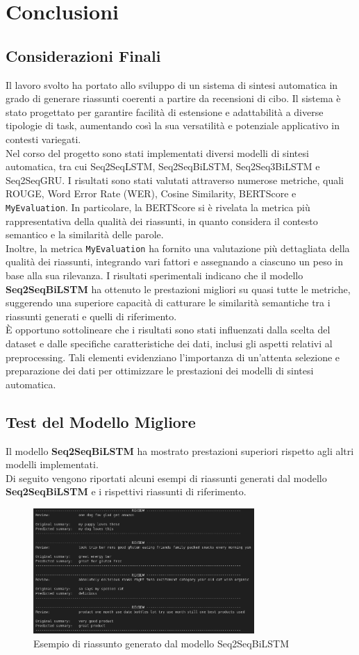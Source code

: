\section{Conclusioni} 
\subsection{Considerazioni Finali}
Il lavoro svolto ha portato allo sviluppo di un sistema di sintesi automatica in grado di generare riassunti coerenti a partire da recensioni di cibo. Il sistema è stato progettato per garantire facilità di estensione e adattabilità a diverse tipologie di task, aumentando così la sua versatilità e potenziale applicativo in contesti variegati.\\
Nel corso del progetto sono stati implementati diversi modelli di sintesi automatica, tra cui Seq2SeqLSTM, Seq2SeqBiLSTM, Seq2Seq3BiLSTM e Seq2SeqGRU.
I risultati sono stati valutati attraverso numerose metriche, quali ROUGE, Word Error Rate (WER), Cosine Similarity, BERTScore e \texttt{MyEvaluation}. In particolare,
la BERTScore si è rivelata la metrica più rappresentativa della qualità dei riassunti, in quanto considera il contesto semantico e la similarità delle parole.\\

Inoltre, la metrica \texttt{MyEvaluation} ha fornito una valutazione più dettagliata della qualità dei riassunti, integrando vari fattori e assegnando a ciascuno 
un peso in base alla sua rilevanza. I risultati sperimentali indicano che il modello \textbf{Seq2SeqBiLSTM} ha ottenuto le prestazioni migliori su quasi tutte le metriche, 
suggerendo una superiore capacità di catturare le similarità semantiche tra i riassunti generati e quelli di riferimento.\\

È opportuno sottolineare che i risultati sono stati influenzati dalla scelta del dataset e dalle specifiche caratteristiche dei dati, 
inclusi gli aspetti relativi al preprocessing. Tali elementi evidenziano l'importanza di un'attenta selezione e preparazione dei dati per 
ottimizzare le prestazioni dei modelli di sintesi automatica.

\subsection{Test del Modello Migliore}
Il modello \textbf{Seq2SeqBiLSTM} ha mostrato prestazioni superiori rispetto agli altri modelli implementati.\\
Di seguito vengono riportati alcuni esempi di riassunti generati dal modello \textbf{Seq2SeqBiLSTM} e i rispettivi riassunti di riferimento.\\

\begin{figure}[H]
    \centering
    \includegraphics[width=0.75\textwidth]{media/Seq2SeqBiLSTM_inference.png}
    \caption{Esempio di riassunto generato dal modello Seq2SeqBiLSTM}
    \label{fig:example1}
\end{figure}